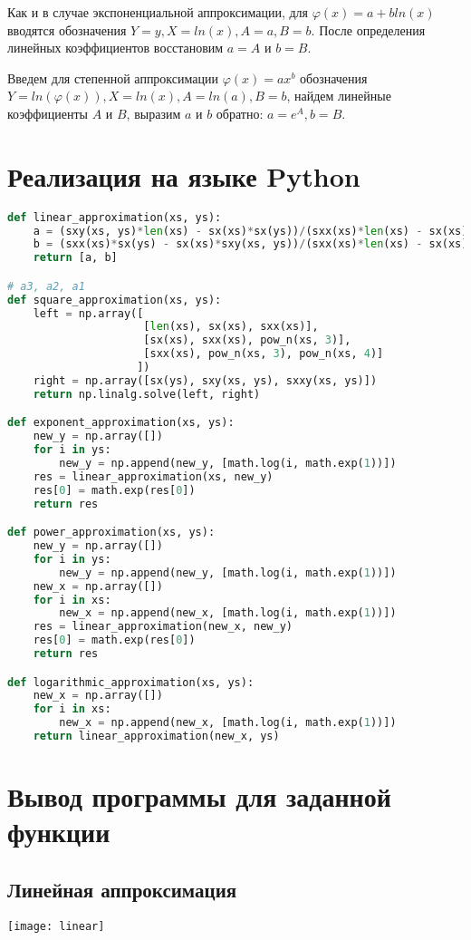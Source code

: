 \documentclass[12pt, a4paper]{article}
\begin{document}
Как и в случае экспоненциальной аппроксимации, для $\varphi(x) = a + bln(x)$ 
вводятся обозначения $Y = y, X = ln(x), A = a, B = b$. После определения
линейных коэффициентов восстановим $a = A$ и $b = B$.

Введем для степенной аппроксимации $\varphi(x) = ax^b$ обозначения $Y = ln(\varphi(x)), X = ln(x), A = ln(a), B = b$,
найдем линейные коэффициенты $A$ и $B$, выразим $a$ и $b$ обратно: $a = e^A, b = B$.

\section*{Реализация на языке Python}

\begin{lstlisting}[language = Python]
def linear_approximation(xs, ys):
    a = (sxy(xs, ys)*len(xs) - sx(xs)*sx(ys))/(sxx(xs)*len(xs) - sx(xs)**2)
    b = (sxx(xs)*sx(ys) - sx(xs)*sxy(xs, ys))/(sxx(xs)*len(xs) - sx(xs)**2)
    return [a, b]

# a3, a2, a1
def square_approximation(xs, ys):
    left = np.array([
                     [len(xs), sx(xs), sxx(xs)],
                     [sx(xs), sxx(xs), pow_n(xs, 3)],
                     [sxx(xs), pow_n(xs, 3), pow_n(xs, 4)]
                    ])
    right = np.array([sx(ys), sxy(xs, ys), sxxy(xs, ys)])
    return np.linalg.solve(left, right)

def exponent_approximation(xs, ys):
    new_y = np.array([])
    for i in ys:
        new_y = np.append(new_y, [math.log(i, math.exp(1))])
    res = linear_approximation(xs, new_y)
    res[0] = math.exp(res[0])
    return res

def power_approximation(xs, ys):
    new_y = np.array([])
    for i in ys:
        new_y = np.append(new_y, [math.log(i, math.exp(1))])
    new_x = np.array([])
    for i in xs:
        new_x = np.append(new_x, [math.log(i, math.exp(1))])
    res = linear_approximation(new_x, new_y)
    res[0] = math.exp(res[0])
    return res

def logarithmic_approximation(xs, ys):
    new_x = np.array([])
    for i in xs:
        new_x = np.append(new_x, [math.log(i, math.exp(1))])
    return linear_approximation(new_x, ys)
\end{lstlisting}

\section*{Вывод программы для заданной функции}
\subsection*{Линейная аппроксимация}
\texttt{[image: linear]}
\end{document}
